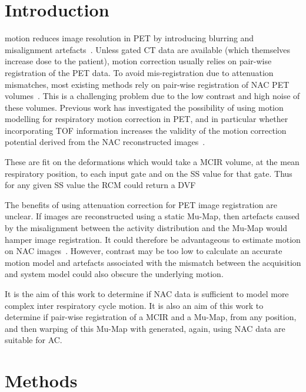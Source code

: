 \documentclass[10pt, twocolumn, twoside, letterpaper]{IEEEtran}
\DeclareRobustCommand{\glss}[1]
{%
  \ifglsused{#1}{\glsshorts{#1}}{\glslongs{#1} (\glsshorts{#1})\glsunset{#1}}%
}
\begin{document}
\section{Introduction} \label{sec:introduction}
     motion reduces image resolution in \gls{PET} by introducing blurring and misalignment artefacts~\cite{Nehmeh2008a}. Unless gated \gls{CT} data are available (which themselves increase dose to the patient), motion correction usually relies on pair-wise registration of the \gls{PET} data. To avoid mis-registration due to attenuation mismatches, most existing methods rely on pair-wise registration of \gls{NAC} \gls{PET} volumes~\cite{Oliveira2014}. This is a challenging problem due to the low contrast and high noise of these volumes. Previous work has investigated the possibility of using motion modelling for respiratory motion correction in \gls{PET}, and in particular whether incorporating \gls{TOF} information increases the validity of the motion correction potential derived from the \gls{NAC} reconstructed images~\cite{Whitehead2019ImpactPET}.
    
    These \glss{RCM} are fit on the deformations which would take a \gls{MCIR} volume, at the mean respiratory position, to each input gate and on the \gls{SS} value for that gate. Thus for any given \gls{SS} value the \gls{RCM} could return a \gls{DVF}
    
    The benefits of using attenuation correction for \gls{PET} image registration are unclear. If images are reconstructed using a static \gls{Mu-Map}, then artefacts caused by the misalignment between the activity distribution and the \gls{Mu-Map} would hamper image registration. It could therefore be advantageous to estimate motion on \gls{NAC} images~\cite{LungMotionDiaphragmBaiBib}. However, contrast may be too low to calculate an accurate motion model and artefacts associated with the mismatch between the acquisition and system model could also obscure the underlying motion.
    
    It is the aim of this work to determine if \gls{NAC} data is sufficient to model more complex inter respiratory cycle motion. It is also an aim of this work to determine if pair-wise registration of a \gls{MCIR} and a \gls{Mu-Map}, from any position, and then warping of this \gls{Mu-Map} with \glss{DVF} generated, again, using \gls{NAC} data are suitable for \gls{AC}.

\section{Methods} \label{sec:methods}
\end{document}
